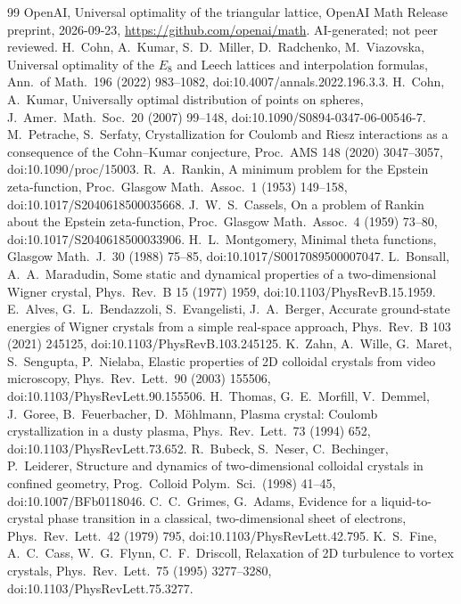 \begin{thebibliography}{99}
 OpenAI, Universal optimality of the triangular lattice, OpenAI Math Release preprint, 2026-09-23, \url{https://github.com/openai/math}. AI-generated; not peer reviewed.
 H.~Cohn, A.~Kumar, S.~D.~Miller, D.~Radchenko, M.~Viazovska, Universal optimality of the $E_8$ and Leech lattices and interpolation formulas, Ann.\ of Math.\ 196 (2022) 983--1082, doi:10.4007/annals.2022.196.3.3.
 H.~Cohn, A.~Kumar, Universally optimal distribution of points on spheres, J.\ Amer.\ Math.\ Soc.\ 20 (2007) 99--148, doi:10.1090/S0894-0347-06-00546-7.
 M.~Petrache, S.~Serfaty, Crystallization for Coulomb and Riesz interactions as a consequence of the Cohn--Kumar conjecture, Proc.\ AMS 148 (2020) 3047--3057, doi:10.1090/proc/15003.
 R.~A.~Rankin, A minimum problem for the Epstein zeta-function, Proc.\ Glasgow Math.\ Assoc.\ 1 (1953) 149--158, doi:10.1017/S2040618500035668.
 J.~W.~S.~Cassels, On a problem of Rankin about the Epstein zeta-function, Proc.\ Glasgow Math.\ Assoc.\ 4 (1959) 73--80, doi:10.1017/S2040618500033906.
 H.~L.~Montgomery, Minimal theta functions, Glasgow Math.\ J.\ 30 (1988) 75--85, doi:10.1017/S0017089500007047.
 L.~Bonsall, A.~A.~Maradudin, Some static and dynamical properties of a two-dimensional Wigner crystal, Phys.\ Rev.\ B 15 (1977) 1959, doi:10.1103/PhysRevB.15.1959.
 E.~Alves, G.~L.~Bendazzoli, S.~Evangelisti, J.~A.~Berger, Accurate ground-state energies of Wigner crystals from a simple real-space approach, Phys.\ Rev.\ B 103 (2021) 245125, doi:10.1103/PhysRevB.103.245125.
 K.~Zahn, A.~Wille, G.~Maret, S.~Sengupta, P.~Nielaba, Elastic properties of 2D colloidal crystals from video microscopy, Phys.\ Rev.\ Lett.\ 90 (2003) 155506, doi:10.1103/PhysRevLett.90.155506.
 H.~Thomas, G.~E.~Morfill, V.~Demmel, J.~Goree, B.~Feuerbacher, D.~M\"ohlmann, Plasma crystal: Coulomb crystallization in a dusty plasma, Phys.\ Rev.\ Lett.\ 73 (1994) 652, doi:10.1103/PhysRevLett.73.652.
 R.~Bubeck, S.~Neser, C.~Bechinger, P.~Leiderer, Structure and dynamics of two-dimensional colloidal crystals in confined geometry, Prog.\ Colloid Polym.\ Sci.\ (1998) 41--45, doi:10.1007/BFb0118046.
 C.~C.~Grimes, G.~Adams, Evidence for a liquid-to-crystal phase transition in a classical, two-dimensional sheet of electrons, Phys.\ Rev.\ Lett.\ 42 (1979) 795, doi:10.1103/PhysRevLett.42.795.
 K.~S.~Fine, A.~C.~Cass, W.~G.~Flynn, C.~F.~Driscoll, Relaxation of 2D turbulence to vortex crystals, Phys.\ Rev.\ Lett.\ 75 (1995) 3277--3280, doi:10.1103/PhysRevLett.75.3277.

\end{thebibliography}
